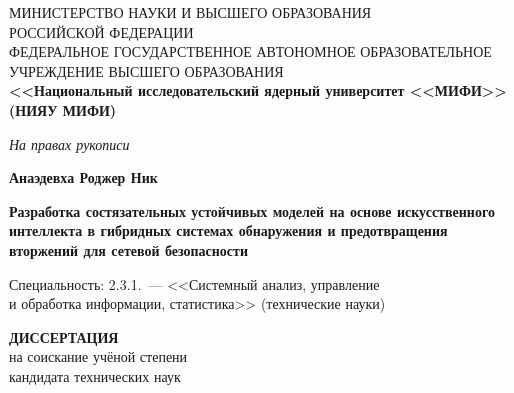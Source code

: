 
\begin{titlepage}
\thispagestyle{empty}
\begin{center}

{\small
МИНИСТЕРСТВО НАУКИ И ВЫСШЕГО ОБРАЗОВАНИЯ\\
РОССИЙСКОЙ ФЕДЕРАЦИИ\\
ФЕДЕРАЛЬНОЕ ГОСУДАРСТВЕННОЕ АВТОНОМНОЕ ОБРАЗОВАТЕЛЬНОЕ\\
УЧРЕЖДЕНИЕ ВЫСШЕГО ОБРАЗОВАНИЯ\\[2pt]
\textbf{<<Национальный исследовательский ядерный университет <<МИФИ>>}\\
\textbf{(НИЯУ МИФИ)}
}

\end{center}

\hfill
\begin{minipage}{0.45\textwidth}
\flushright
\itshape На правах рукописи
\end{minipage}

\vspace{2.0cm}

\begin{center}

{\large\textbf{Анаэдевха Роджер Ник}}

\vspace{1.6cm}

{\large\textbf{Разработка состязательных устойчивых
моделей на основе искусственного интеллекта в гибридных
системах обнаружения и предотвращения вторжений для
сетевой безопасности}}

\vspace{2.0cm}

{\small
Специальность: 2.3.1.~--- <<Системный анализ, управление\\
и обработка информации, статистика>> (технические науки)
}

\vspace{1.5cm}

\textbf{ДИССЕРТАЦИЯ}\\[2pt]
на соискание учёной степени\\
кандидата технических наук


\end{center}
\end{titlepage}
